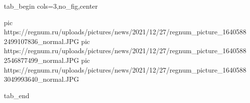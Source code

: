  
 
 
 
 


\ifcmt
  tab_begin cols=3,no_fig,center

     pic https://regnum.ru/uploads/pictures/news/2021/12/27/regnum_picture_16405882499107836_normal.JPG
		 pic https://regnum.ru/uploads/pictures/news/2021/12/27/regnum_picture_16405882546877499_normal.JPG
		 pic https://regnum.ru/uploads/pictures/news/2021/12/27/regnum_picture_16405883049993640_normal.JPG

  tab_end
\fi
